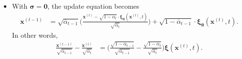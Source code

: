 \documentclass[10pt]{article}
\newcommand{\ve}[1]{\mathbf{#1}}
\newcommand{\ves}[1]{\boldsymbol{#1}}
\begin{document}
\begin{itemize}
  \item With $\ves{\sigma} = \ves{0}$, the update equation becomes
  \begin{align*}
    \ve{x}^{(t-1)} 
    &= \sqrt{\overline{\alpha}_{t-1}} \bigg( \frac{\ve{x}^{(t)} - \sqrt{1 - \overline{\alpha}_{t}} \cdot \ves{\xi}_{\ves{\theta}}(\ve{x}^{(t)}, t)}{\sqrt{\overline{\alpha}_t}} \bigg)
    + \sqrt{1 - \overline{\alpha}_{t-1}} \cdot \ves{\xi}_{\ves{\theta}}(\ve{x}^{(t)}, t).
  \end{align*}
  In other words,
  \begin{align}
    \frac{\ve{x}^{(t-1)}}{\sqrt{\overline{\alpha}_{t-1}}} - \frac{\ve{x}^{(t)}}{\sqrt{\overline{\alpha}_t}}
    &= \bigg( \frac{\sqrt{1 - \overline{\alpha}_{t-1}}}{\sqrt{\overline{\alpha}_{t-1}}} - \frac{\sqrt{1 - \overline{\alpha}_t}}{\sqrt{\overline{\alpha}_t}} \bigg)
    \ves{\xi}(\ve{x}^{(t)}, t). \label{ddim-update-equation}
  \end{align}


\end{itemize}
\end{document}
